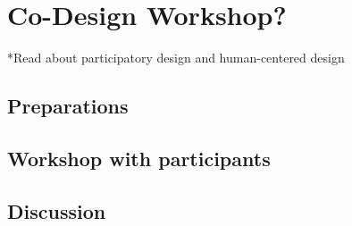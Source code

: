 \chapter{Co-Design Workshop?}
*Read about participatory design and human-centered design

\section{Preparations}
\section{Workshop with participants}
\section{Discussion}